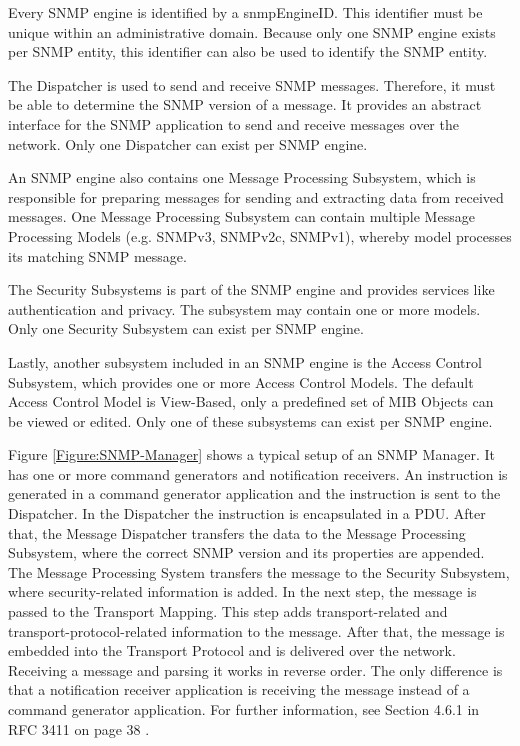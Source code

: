 Every SNMP engine is identified by a snmpEngineID. This identifier must be unique within an administrative domain. Because only one SNMP engine exists per SNMP entity, this identifier can also be used to identify the SNMP entity.

\newpage
The Dispatcher is used to send and receive SNMP messages. Therefore, it must be able to determine the SNMP version of a message. It provides an abstract interface for the SNMP application to send and receive messages over the network. Only one Dispatcher can exist per SNMP engine.

An SNMP engine also contains one Message Processing Subsystem, which is responsible for preparing messages for sending and extracting data from received messages. One Message Processing Subsystem can contain multiple Message Processing Models (e.g. SNMPv3, SNMPv2c, SNMPv1), whereby model processes its matching SNMP message.

The Security Subsystems is part of the SNMP engine and provides services like authentication and privacy. The subsystem may contain one or more models. Only one Security Subsystem can exist per SNMP engine.

Lastly, another subsystem included in an SNMP engine is the Access Control Subsystem, which provides one or more Access Control Models. The default Access Control Model is View-Based, only a predefined set of MIB Objects can be viewed or edited. Only one of these subsystems can exist per SNMP engine.

Figure \ref{Figure:SNMP-Manager} shows a typical setup of an SNMP Manager. It has one or more command generators and notification receivers. An instruction is generated in a command generator application and the instruction is sent to the Dispatcher. In the Dispatcher the instruction is encapsulated in a PDU. After that, the Message Dispatcher transfers the data to the Message Processing Subsystem, where the correct SNMP version and its properties are appended. The Message Processing System transfers the message to the Security Subsystem, where security-related information is added. In the next step, the message is passed to the Transport Mapping. This step adds transport-related and transport-protocol-related information to the message. After that, the message is embedded into the Transport Protocol and is delivered over the network. Receiving a message and parsing it works in reverse order. The only difference is that a notification receiver application is receiving the message instead of a command generator application. For further information, see Section 4.6.1 in RFC 3411 on page 38 \cite{RFC:RFC3411:2002}.


